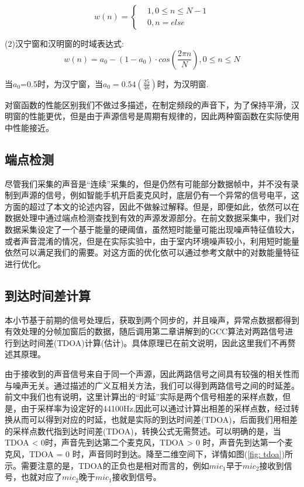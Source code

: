 \documentclass[winfonts]{njuthesis}
\begin{document}
			\begin{equation}
				w(n)=\left\{
				\begin{aligned}
					&1, 0\leq n \leq N - 1\\
					&0, n = else
				\end{aligned}
				\right.
			\end{equation}
			
			
			(2)汉宁窗和汉明窗的时域表达式:
			\begin{equation}
				w(n)=a_0-(1-a_0)\cdot cos(\frac{2\pi n}{N}), 0 \leq n \leq N
			\end{equation}
			
			当$a_0$=0.5时，为汉宁窗，当$a_0=0.54(\frac{25}{46})$时，为汉明窗.
			
			对窗函数的性能区别我们不做过多描述，在制定频段的声音下，为了保持平滑，汉明窗的性能更优，但是由于声源信号是周期有规律的，因此两种窗函数在实际使用中性能接近。
			
			
		\subsection{端点检测}
		
			尽管我们采集的声音是“连续”采集的，但是仍然有可能部分数据帧中，并不没有录制到声源的信号，例如智能手机开启麦克风时，底层仍有一个异常的信号电平，这方面的超过了本文的论述内容，因此不做躲过解释。但是，即便如此，依然可以在数据处理中通过端点检测查找到有效的声源发源部分。在前文数据采集中，我们对数据采集设定了一个基于能量的硬阈值，虽然短时能量可能出现噪声特征值较大，或者声音混淆的情况，但是在实际实验中，由于室内环境噪声较小，利用短时能量依然可以满足我们的需要。对这方面的优化依可以通过参考文献\cite{Endpoint_detection}中的对数能量特征进行优化。
		
		\subsection{到达时间差计算}
			
			本小节基于前期的信号处理后，获取到两个同步的，并且噪声，异常点数据都得到有效处理的分帧加窗后的数据，随后调用第二章讲解到的GCC算法对两路信号进行到达时间差(TDOA)计算(估计)。具体原理已在前文说明，因此这里我们不再赘述其原理。
			
			由于接收到的声音信号来自于同一个声源，因此两路信号之间具有较强的相关性而与噪声无关。通过描述的广义互相关方法，我们可以得到两路信号之间的时延差。前文中我们也有说明，这里计算出的“时延”实际是两个信号相差的采样点数，但是，由于采样率为设定好的44100Hz,因此可以通过计算出相差的采样点数，经过转换从而可以得到对应的时延，也就是实际的到达时间差(TDOA)，后面我们用相差的采样点数代指到达时间差(TDOA)，转换公式无需赘述。可以明确的是，当TDOA < 0时，声音先到达第二个麦克风，TDOA > 0 时，声音先到达第一个麦克风，TDOA = 0 时，声音同时到达。降至二维空间下，详情如图(\ref{fig: tdoa})所示。需要注意的是，TDOA的正负也是相对而言的，例如$mic_1$早于$mic_2$接收到信号，也就对应了$mic_2$晚于$mic_1$接收到信号。
			
\end{document}
